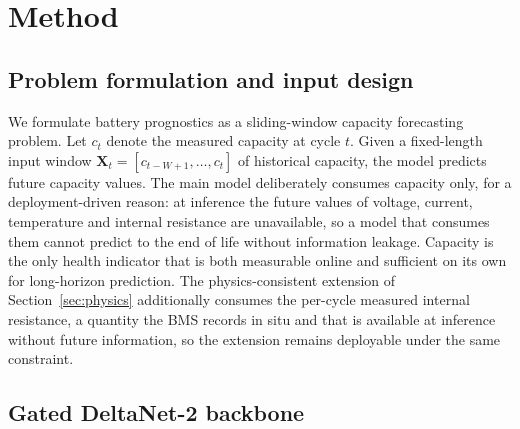 \section{Method}
\label{sec:method}

\subsection{Problem formulation and input design}
\label{sec:formulation}

We formulate battery prognostics as a sliding-window capacity
forecasting problem. Let $c_t$ denote the measured capacity at cycle
$t$. Given a fixed-length input window
$\mathbf{X}_{t} = [c_{t-W+1}, \ldots, c_t]$ of historical capacity,
the model predicts future capacity values. The main model
deliberately consumes capacity only, for a deployment-driven
reason: at inference the future values of voltage, current,
temperature and internal resistance are unavailable, so a model that
consumes them cannot predict to the end of life without information
leakage. Capacity is the only health indicator that is both
measurable online and sufficient on its own for long-horizon
prediction. The physics-consistent extension of
Section~\ref{sec:physics} additionally consumes the per-cycle
measured internal resistance, a quantity the BMS records in
situ and that is available at inference without future information, so the
extension remains deployable under the same constraint.

\subsection{Gated DeltaNet-2 backbone}
\label{sec:gdn2}

